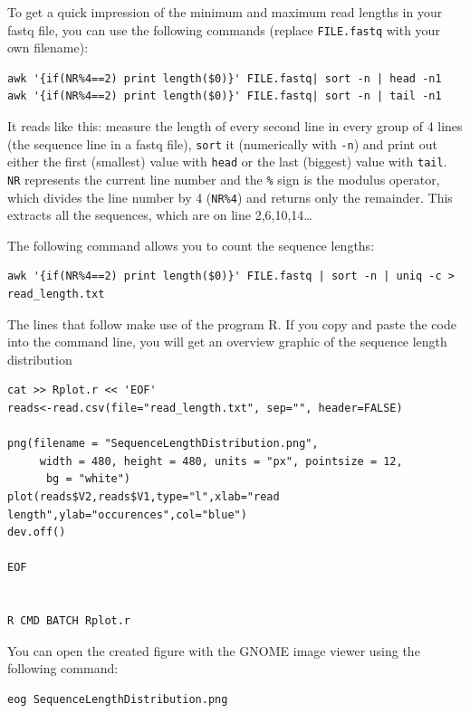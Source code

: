 \documentclass[11pt]{article}
\begin{document}
To get a quick impression of the minimum and maximum read lengths in
your fastq file, you can use the following commands (replace
\texttt{FILE.fastq} with your own filename):

\begin{verbatim}
awk '{if(NR%4==2) print length($0)}' FILE.fastq| sort -n | head -n1
awk '{if(NR%4==2) print length($0)}' FILE.fastq| sort -n | tail -n1
\end{verbatim}

It reads like this: measure the length of every second line in every
group of 4 lines (the sequence line in a fastq file), \texttt{sort} it
(numerically with \texttt{-n}) and print out either the first (smallest)
value with \texttt{head} or the last (biggest) value with \texttt{tail}. \texttt{NR}
represents the current line number and the \texttt{\%} sign is the modulus
operator, which divides the line number by 4 (\texttt{NR\%4}) and returns only
the remainder. This extracts all the sequences, which are on line
2,6,10,14\ldots{}


The following command allows you to count the sequence lengths:

\begin{verbatim}
awk '{if(NR%4==2) print length($0)}' FILE.fastq | sort -n | uniq -c > read_length.txt
\end{verbatim}

The lines that follow make use of the program R. If you copy and
paste the code into the command line, you will get an overview graphic
of the sequence length distribution 

\begin{verbatim}
cat >> Rplot.r << 'EOF'
reads<-read.csv(file="read_length.txt", sep="", header=FALSE)

png(filename = "SequenceLengthDistribution.png",
	 width = 480, height = 480, units = "px", pointsize = 12,
	  bg = "white")
plot(reads$V2,reads$V1,type="l",xlab="read length",ylab="occurences",col="blue")
dev.off()

EOF


R CMD BATCH Rplot.r
\end{verbatim}

You can open the created figure with the GNOME image viewer using the
following command:

\begin{verbatim}
eog SequenceLengthDistribution.png
\end{verbatim}
\end{document}
